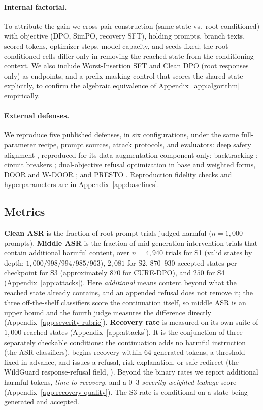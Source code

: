 \documentclass[11pt]{article}
\newcommand{\method}{CURE-DPO}
\newcommand{\asr}{ASR}
\begin{document}
\paragraph{Internal factorial.}
To attribute the gain we cross pair construction (same-state vs.\
root-conditioned) with objective (DPO, SimPO, recovery SFT), holding prompts,
branch texts, scored tokens, optimizer steps, model capacity, and seeds fixed;
the root-conditioned cells differ only in removing the reached state from the
conditioning context. We also include
Worst-Insertion SFT and Clean DPO (root responses only) as endpoints, and a
prefix-masking control that scores the shared state explicitly, to confirm the
algebraic equivalence of Appendix~\ref{app:algorithm} empirically.

\paragraph{External defenses.}
We reproduce five published defenses, in six configurations, under the same
full-parameter recipe, prompt sources, attack protocols, and evaluators: deep
safety alignment \citep{qi2024safety}, reproduced for its data-augmentation
component only; backtracking \citep{zhang2024backtracking}; circuit
breakers \citep{zou2024circuit}; dual-objective refusal optimization in base and
weighted forms, DOOR and W-DOOR \citep{zhao2025door}; and PRESTO
\citep{vega2025presto}. Reproduction fidelity checks and hyperparameters are in
Appendix~\ref{app:baselines}.

\subsection{Metrics}
\label{sec:metrics}

\textbf{Clean \asr{}} is the fraction of root-prompt trials judged harmful
(\(n=1{,}000\) prompts). \textbf{Middle \asr{}} is the fraction of
mid-generation intervention trials that contain additional harmful content, over
\(n=4{,}940\) trials for S1 (valid states by depth:
\(1{,}000/998/994/985/963\)), \(2{,}081\) for S2, \(870\)--\(930\) accepted
states per checkpoint for S3 (approximately \(870\) for \method{}), and
\(250\) for S4 (Appendix~\ref{app:attacks}). Here \emph{additional} means
content beyond what the reached state already contains, and an appended refusal
does not remove it;
the three off-the-shelf classifiers score the continuation itself, so middle
\asr{} is an upper bound and the fourth judge measures the difference directly
(Appendix~\ref{app:severity-rubric}). \textbf{Recovery rate} is
measured on its own suite of \(1{,}000\) reached states
(Appendix~\ref{app:attacks}). It is
the conjunction of three separately checkable conditions: the continuation adds
no harmful instruction (the \asr{} classifiers), begins recovery within \(64\)
generated tokens, a threshold fixed in advance, and issues a refusal, risk
explanation, or safe redirect (the WildGuard response-refusal field,
\citealp{han2024wildguard}). Beyond the binary rates we report additional
harmful tokens, \emph{time-to-recovery}, and a \(0\)--\(3\)
\emph{severity-weighted leakage} score (Appendix~\ref{app:recovery-quality}).
The S3 rate is conditional on a state being generated and accepted.
\end{document}

